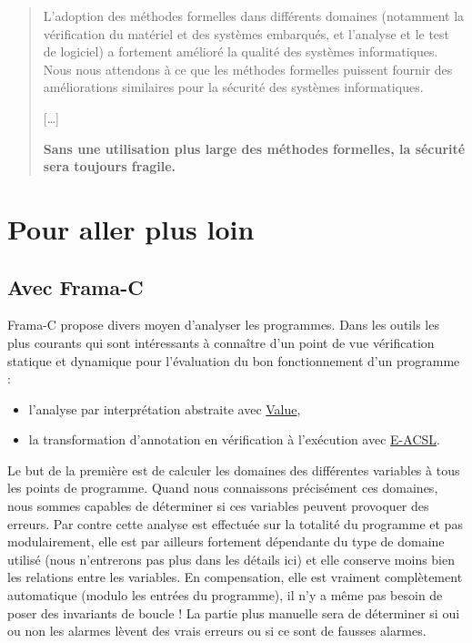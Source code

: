 \documentclass[12pt,francais,]{scrbook}
\providecommand{\tightlist}{%
  \setlength{\itemsep}{0pt}\setlength{\parskip}{0pt}}
\newenvironment{zdssecretblock}[1]{%
  \tcolorbox[beamer,%
    noparskip,breakable,
    colback=LightGray,colframe=DarkGray,%
    colbacklower=LightGray,%
    title=#1]
}{\endtcolorbox}
\begin{document}
\begin{zdssecretblock}{Traduction}
  \begin{quote}
    L'adoption des méthodes formelles dans différents domaines (notamment la
    vérification du matériel et des systèmes embarqués, et l'analyse et le
    test de logiciel) a fortement amélioré la qualité des systèmes
    informatiques. Nous nous attendons à ce que les méthodes formelles
    puissent fournir des améliorations similaires pour la sécurité des
    systèmes informatiques.
    
    {[}\ldots{}{]}
    
    \textbf{Sans une utilisation plus large des méthodes formelles, la
      sécurité sera toujours fragile.}
  \end{quote}
\end{zdssecretblock}

\chapter{Pour aller plus loin}\label{pour-aller-plus-loin}

\section{Avec Frama-C}\label{avec-frama-c}

Frama-C propose divers moyen d'analyser les programmes. Dans les outils
les plus courants qui sont intéressants à connaître d'un point de vue
vérification statique et dynamique pour l'évaluation du bon
fonctionnement d'un programme :

\begin{itemize}
\tightlist
\item
  l'analyse par interprétation abstraite avec
  \href{http://frama-c.com/value.html}{Value},
\item
  la transformation d'annotation en vérification à l'exécution avec
  \href{http://frama-c.com/eacsl.html}{E-ACSL}.
\end{itemize}

Le but de la première est de calculer les domaines des différentes
variables à tous les points de programme. Quand nous connaissons
précisément ces domaines, nous sommes capables de déterminer si ces
variables peuvent provoquer des erreurs. Par contre cette analyse est
effectuée sur la totalité du programme et pas modulairement, elle est
par ailleurs fortement dépendante du type de domaine utilisé (nous
n'entrerons pas plus dans les détails ici) et elle conserve moins bien
les relations entre les variables. En compensation, elle est vraiment
complètement automatique (modulo les entrées du programme), il n'y a
même pas besoin de poser des invariants de boucle ! La partie plus
\og{}manuelle\fg{} sera de déterminer si oui ou non les alarmes lèvent des
vrais erreurs ou si ce sont de fausses alarmes.
\end{document}
